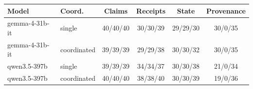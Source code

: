 \begin{tabular}{llcccc}
\toprule
Model & Coord. & Claims & Receipts & State & Provenance \\
\midrule
gemma-4-31b-it & single & 40/40/40 & 30/30/39 & 29/29/30 & 30/0/35 \\
gemma-4-31b-it & coordinated & 39/39/39 & 29/29/38 & 30/30/32 & 30/0/35 \\
qwen3.5-397b & single & 39/39/39 & 34/34/37 & 30/30/38 & 21/0/34 \\
qwen3.5-397b & coordinated & 40/40/40 & 38/38/40 & 30/30/39 & 19/0/36 \\
\bottomrule
\end{tabular}
